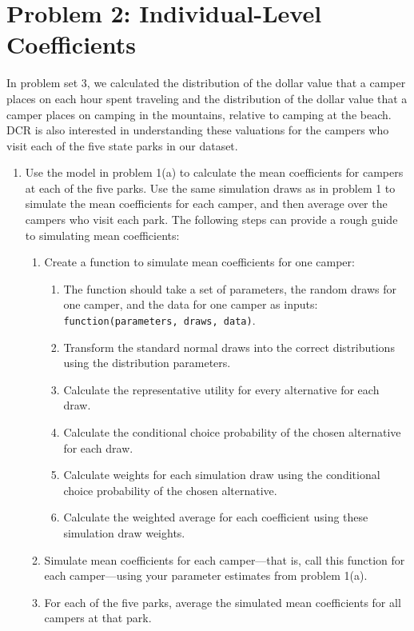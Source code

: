 \documentclass[11pt,letterpaper]{article}
\begin{document}
\section*{Problem 2: Individual-Level Coefficients}

In problem set 3, we calculated the distribution of the dollar value that a camper places on each hour spent traveling and the distribution of the dollar value that a camper places on camping in the mountains, relative to camping at the beach. DCR is also interested in understanding these valuations for the campers who visit each of the five state parks in our dataset. 

\begin{enumerate}[label=\alph*., leftmargin=*]
	\item Use the model in problem 1(a) to calculate the mean coefficients for campers at each of the five parks. Use the same simulation draws as in problem 1 to simulate the mean coefficients for each camper, and then average over the campers who visit each park. The following steps can provide a rough guide to simulating mean coefficients:
	\begin{enumerate}[label=\Roman*.]
		\item Create a function to simulate mean coefficients for one camper:
		\begin{enumerate}[label=\roman*.]
			\item The function should take a set of parameters, the random draws for one camper, and the data for one camper as inputs: \texttt{function(parameters, draws, data)}.
			\item Transform the standard normal draws into the correct distributions using the distribution parameters.
			\item Calculate the representative utility for every alternative for each draw.
			\item Calculate the conditional choice probability of the chosen alternative for each draw.
			\item Calculate weights for each simulation draw using the conditional choice probability of the chosen alternative.
			\item Calculate the weighted average for each coefficient using these simulation draw weights.
		\end{enumerate}
		\item Simulate mean coefficients for each camper---that is, call this function for each camper---using your parameter estimates from problem 1(a).
		\item For each of the five parks, average the simulated mean coefficients for all campers at that park.
	\end{enumerate}


\end{enumerate}
\end{document}
